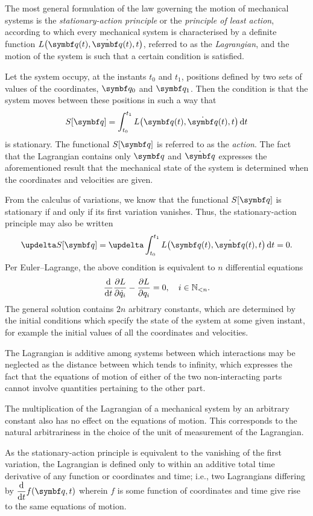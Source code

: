 The most general formulation of the law governing the motion of mechanical systems is the \emph{stationary-action
principle} or the \emph{principle of least action}, according to which every mechanical system is characterised by a
definite function \(L\big(\vct{q}(t), \dot{\vct{q}}(t), t\big)\), referred to as the \emph{Lagrangian}, and the motion
of the system is such that a certain condition is satisfied.

Let the system occupy, at the instants \(t_0\) and \(t_1\), positions defined by two sets of values of the coordinates,
\(\vct{q}_0\) and \(\vct{q}_1\). Then the condition is that the system moves between these positions in such a way that
\[
  S[\vct{q}] = \int_{t_0}^{t_1} L\big(\vct{q}(t), \dot{\vct{q}}(t), t\big) \diff t
\]
is stationary. The functional \(S[\vct{q}]\) is referred to as the \emph{action}. The fact that the Lagrangian contains
only \(\vct{q}\) and \(\dot{\vct{q}}\) expresses the aforementioned result that the mechanical state of the system is
determined when the coordinates and velocities are given.

From the calculus of variations, we know that the functional \(S[\vct{q}]\) is stationary if and only if its first
variation vanishes. Thus, the stationary-action principle may also be written
\[
  \updelta S[\vct{q}] = \updelta \int_{t_0}^{t_1} L\big(\vct{q}(t), \dot{\vct{q}}(t), t\big) \diff t = 0.
\]
Per Euler--Lagrange, the above condition is equivalent to \(n\) differential equations
\[
  \frac{\mathop{}\!\mathrm{d}}{\mathop{}\!\mathrm{d} t} \frac{\partial L}{\partial \dot{q}_i} - \frac{\partial L}{\partial q_i} = 0, \quad i \in \mathbb{N}_{<n}.
\]
The general solution contains \(2 n\) arbitrary constants, which are determined by the initial conditions which specify
the state of the system at some given instant, for example the initial values of all the coordinates and velocities.

The Lagrangian is additive among systems between which interactions may be neglected as the distance between which tends
to infinity, which expresses the fact that the equations of motion of either of the two non-interacting parts cannot
involve quantities pertaining to the other part.

The multiplication of the Lagrangian of a mechanical system by an arbitrary constant also has no effect on the equations
of motion. This corresponds to the natural arbitrariness in the choice of the unit of measurement of the Lagrangian.

As the stationary-action principle is equivalent to the vanishing of the first variation, the Lagrangian is defined only
to within an additive total time derivative of any function or coordinates and time; i.e., two Lagrangians differing by
\(\dis \frac{\diff}{\diff t} f(\vct{q}, t)\) wherein \(f\) is some function of coordinates and time give rise to the
same equations of motion.

